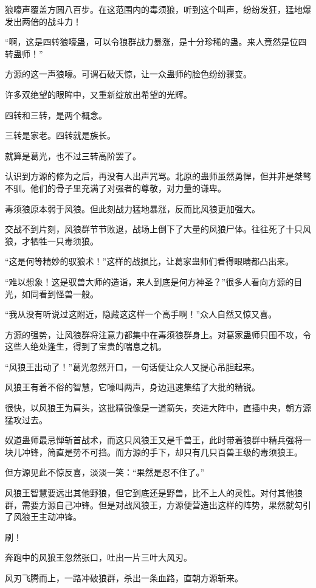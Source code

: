 \begin{this_body}
狼嚎声覆盖方圆八百步。在这范围内的毒须狼，听到这个叫声，纷纷发狂，猛地爆发出两倍的战斗力！

“啊，这是四转狼嚎蛊，可以令狼群战力暴涨，是十分珍稀的蛊。来人竟然是位四转蛊师！”

方源的这一声狼嚎。可谓石破天惊，让一众蛊师的脸色纷纷骤变。

许多双绝望的眼眸中，又重新绽放出希望的光辉。

四转和三转，是两个概念。

三转是家老。四转就是族长。

就算是葛光，也不过三转高阶罢了。

认识到方源的修为之后，再没有人出声咒骂。北原的蛊师虽然勇悍，但并非是桀骜不驯。他们的骨子里充满了对强者的尊敬，对力量的谦卑。

毒须狼原本弱于风狼。但此刻战力猛地暴涨，反而比风狼更加强大。

交战不到片刻，风狼群节节败退，战场上倒下了大量的风狼尸体。往往死了十只风狼，才牺牲一只毒须狼。

“这是何等精妙的驭狼术！”这样的战损比，让葛家蛊师们看得眼睛都凸出来。

“难以想象！这是驭兽大师的造诣，来人到底是何方神圣？”很多人看向方源的目光，如同看到怪兽一般。

“我从没有听说过这附近，隐藏这这样一个高手啊！”众人自然又惊又喜。

方源的强势，让风狼群将注意力都集中在毒须狼群身上。对葛家蛊师只围不攻，令这些人绝处逢生，得到了宝贵的喘息之机。

“风狼王出动了！”葛光忽然开口，一句话便让众人又提心吊胆起来。

风狼王有着不俗的智慧，它嚎叫两声，身边迅速集结了大批的精锐。

很快，以风狼王为肩头，这批精锐像是一道箭矢，突进大阵中，直插中央，朝方源猛攻过去。

奴道蛊师最忌惮斩首战术，而这只风狼王又是千兽王，此时带着狼群中精兵强将一块儿冲锋，简直是势不可挡。而方源的手下，却只有几只百兽王级的毒须狼王。

但方源见此不惊反喜，淡淡一笑：“果然是忍不住了。”

风狼王智慧要远出其他野狼，但它到底还是野兽，比不上人的灵性。对付其他狼群，需要方源自己冲锋。但是对战风狼王，方源便营造出这样的阵势，果然就勾引了风狼王主动冲锋。

刷！

奔跑中的风狼王忽然张口，吐出一片三叶大风刃。

风刃飞腾而上，一路冲破狼群，杀出一条血路，直朝方源斩来。


\end{this_body}

